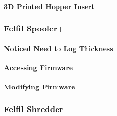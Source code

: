 \paragraph*{3D Printed Hopper Insert\label{sec:methedology:extrusion:felfilSystem:felfilEvoHopperImprovements:3dPrintedHopperInsert}}

\subsubsection{Felfil Spooler+\label{sec:methedology:extrusion:felfilSystem:felfilSpooler}}

\paragraph*{Noticed Need to Log Thickness\label{sec:methedology:extrusion:felfilSystem:felfilSpooler:noticedNeedToLogThickness}}

\paragraph*{Accessing Firmware\label{sec:methedology:extrusion:felfilSystem:felfilSpooler:accessingFirmware}}

\paragraph*{Modifying Firmware\label{sec:methedology:extrusion:felfilSystem:felfilSpooler:modifyingFirmware}}

\subsubsection{Felfil Shredder\label{sec:methedology:extrusion:felfilSystem:felfilShredder}}
